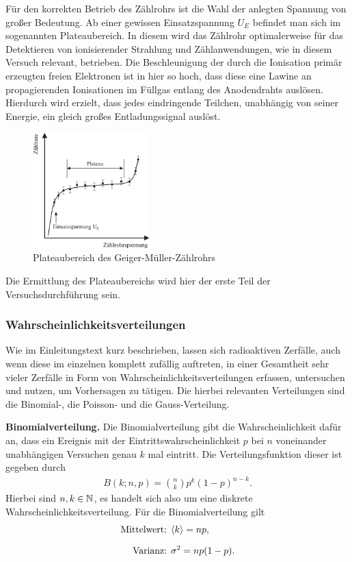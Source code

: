 Für den korrekten Betrieb des Zählrohrs ist die Wahl der anlegten Spannung von großer Bedeutung. Ab einer gewissen Einsatzspannung $U_E$ befindet man sich im sogenannten Plateaubereich. In diesem wird das Zählrohr optimalerweise für das Detektieren von ionisierender Strahlung und Zählanwendungen, wie in diesem Versuch relevant, betrieben. Die Beschleunigung der durch die Ionisation primär erzeugten freien Elektronen ist in hier so hoch, dass diese eine Lawine an propagierenden Ionisationen im Füllgas entlang des Anodendrahts auslösen. Hierdurch wird erzielt, dass jedes eindringende Teilchen, unabhängig von seiner Energie, ein gleich großes Entladungssignal auslöst.

\begin{figure}[H]
  \centering
  \includegraphics[width=0.4\textwidth]{files/plateaubereich.png}
  \caption{Plateaubereich des Geiger-Müller-Zählrohrs}
  \label{fig:gm_zaehlrohr}
\end{figure}

Die Ermittlung des Plateaubereichs wird hier der erste Teil der Versuchsdurchführung sein.

\subsubsection*{Wahrscheinlichkeitsverteilungen}

Wie im Einleitungstext kurz beschrieben, lassen sich radioaktiven Zerfälle, auch wenn diese im einzelnen komplett zufällig auftreten, in einer Gesamtheit sehr vieler Zerfälle in Form von Wahrscheinlichkeitsverteilungen erfassen, untersuchen und nutzen, um Vorhersagen zu tätigen. Die hierbei relevanten Verteilungen sind die Binomial-, die Poisson- und die Gauss-Verteilung. 

\textbf{Binomialverteilung.} Die Binomialverteilung gibt die Wahrscheinlichkeit dafür an, dass ein Ereignis mit der Eintrittswahrscheinlichkeit $p$ bei $n$ voneinander unabhängigen Versuchen genau $k$ mal eintritt. Die Verteilungsfunktion dieser ist gegeben durch
\begin{align}
  B(k;n,p) = \binom{n}{k} p^k (1 - p)^{n-k}.
\end{align}
Hierbei sind $n, k \in \mathbb{N}$, es handelt sich also um eine diskrete Wahrscheinlichkeitsverteilung. Für die Binomialverteilung gilt
\begin{align}
  \text{Mittelwert: }& \langle k \rangle = np,\\[0.6em]
  \text{Varianz: }& \sigma^2 = np(1-p).
\end{align}

